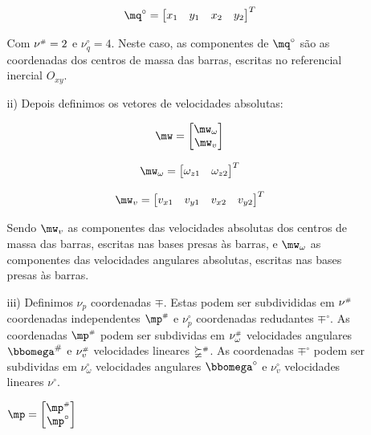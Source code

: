 \begin{itemize}
\begin{itemize}
	\begin{equation}
	\mq^\circ = \begin{bmatrix}
	x_1 & y_1 & x_2 & y_2
	\end{bmatrix}^T
	\end{equation}

	Com $\nu^{\scriptscriptstyle \#} = 2$ e $\nu_q^\circ = 4$. Neste caso, as componentes de $\mq^\circ$ s\~ao as coordenadas dos centros de massa das barras, escritas no referencial 	inercial $O_{xy}$. \\
	
	\item[ii)] Depois definimos os vetores de velocidades absolutas:
	
	$$ \mw =
	\begin{bmatrix}
	\mw_\omega \\
	\mw_v
	\end{bmatrix}
	$$
	
	\begin{equation}
	\mw_\omega = \begin{bmatrix}
	\omega_{z1} & \omega_{z2}
	\end{bmatrix}^T
	\end{equation}
	
	\begin{equation}
	\mw_v = \begin{bmatrix}
	v_{x1} & v_{y1} & v_{x2} & v_{y2}
	\end{bmatrix}^T
	\end{equation}
	
	Sendo $\mw_v$ as componentes das velocidades absolutas dos centros de massa das barras, escritas nas bases presas às barras, e $\mw_\omega$ as componentes das velocidades angulares absolutas, escritas nas bases presas às barras. \\
	
	\item[iii)] Definimos $\nu_p$ coordenadas  $\mp$. Estas podem ser subdivididas em $\nu^{\scriptscriptstyle \#}$ coordenadas independentes $\mp\ssh$ e $\nu_p^\circ$ coordenadas redudantes $\mp^\circ$. As coordenadas $\mp\ssh$ podem ser subdividas em $\nu_\omega^{\scriptscriptstyle \#}$ velocidades angulares $\momega^{\#}$ e $\nu_v^{\scriptscriptstyle \#}$ velocidades lineares $\mathbb{\nu}^{\scriptscriptstyle \#}$. As coordenadas $\mp^\circ$ podem ser subdividas em $\nu_\omega^\circ$ velocidades angulares $\momega^\circ$ e $\nu_v^\circ$ velocidades lineares $\mathbb{\nu}^\circ$.
	
	
	\begin{multicols}{3}
	$ \mp = \begin{bmatrix}
	\mp\ssh \\
	\mp^\circ
	\end{bmatrix} $


\end{multicols}
\end{itemize}
\end{itemize}
